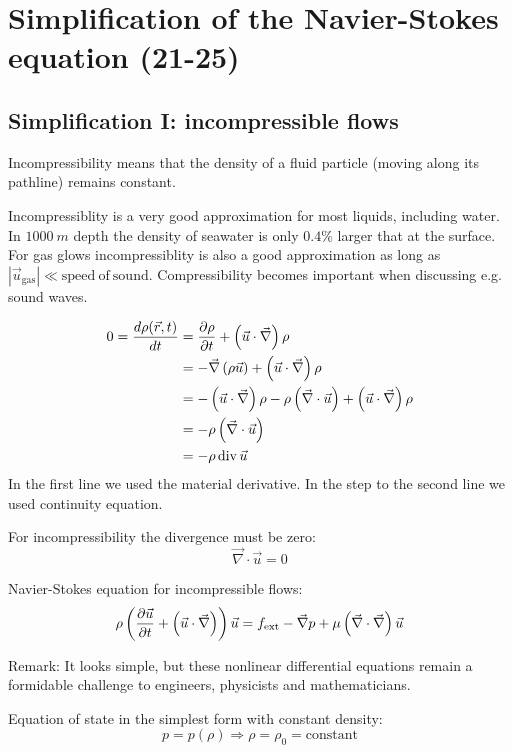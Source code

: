 \section{Simplification of the Navier-Stokes equation (21-25)}

\subsection{Simplification I: incompressible flows}
Incompressibility means that the density of a fluid particle (moving along its pathline) remains constant.

Incompressiblity is a very good approximation for most liquids, including water. In $\SI{1000}{m}$ depth the density of seawater is only $0.4\%$ larger that at the surface. For gas glows incompressiblity is also a good approximation as long as $|\vec{u}_\mathrm{gas}| \ll \mathrm{speed\ of\ sound}$. Compressibility becomes important when discussing e.g. sound waves.

\begin{align}
0 = \frac{d \rho(\vec{r},t)}{d t} &= \frac{\partial \rho}{\partial t}+\left(\vec{u}\cdot\vec{\nabla}\right)\rho\\
&= -\vec{\nabla}\left(\rho\vec{u}\right)+\left(\vec{u}\cdot\vec{\nabla}\right)\rho \\
&= -\left(\vec{u}\cdot\vec{\nabla}\right)\rho - \rho\left(\vec{\nabla}\cdot\vec{u}\right) + \left(\vec{u}\cdot\vec{\nabla}\right)\rho\\
&= -\rho\left(\vec{\nabla}\cdot\vec{u}\right)\\
&= -\rho\, \mathrm{div}\, \vec{u}
\end{align}
In the first line we used the material derivative. In the step to the second line we used continuity equation.

For incompressibility the divergence must be zero:
\begin{equation}
\vec{\nabla}\cdot\vec{u} = 0
\end{equation}

Navier-Stokes equation for incompressible flows:
\begin{equation}
\rho\left(\frac{\partial \vec{u}}{\partial t}+\left(\vec{u}\cdot\vec{\nabla}\right)\right)\vec{u} = f_\mathrm{ext}-\vec{\nabla}p+\mu\left(\vec{\nabla}\cdot\vec{\nabla}\right)\vec{u}
\end{equation}
\begin{framed}
Remark: It looks simple, but these nonlinear differential equations remain a formidable challenge to engineers, physicists and mathematicians.
\end{framed}
Equation of state in the simplest form with constant density:
\begin{equation}
p=p(\rho) \Rightarrow \rho=\rho_0=\mathrm{constant}
\end{equation}


